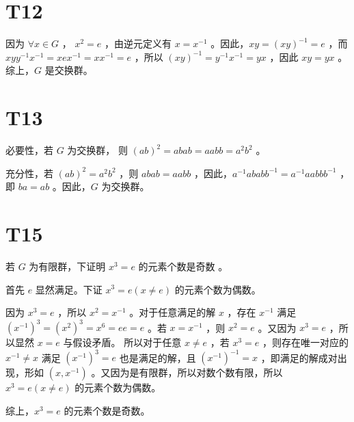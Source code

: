 \documentclass[fontset=windows]{article}
\begin{document}
\section*{T12}

因为 $\forall x \in G$ ， $x ^ 2 = e$ ，由逆元定义有 $x = x ^ {-1}$ 。因此，$x y = (xy) ^ {-1} = e$ ，而 $x y y ^ {-1} x ^ {-1} = x e x ^ {-1} = x x ^ {-1} = e$ ，所以 $(xy) ^ {-1} = y ^ {-1} x ^ {-1} = y x$ ，因此 $xy = yx$ 。综上，$G$ 是交换群。

\section*{T13}

必要性，若 $G$ 为交换群， 则 $(ab)^2 = abab = aabb = a^2 b^2$ 。

充分性，若 $(ab)^2 = a^2 b^2$ ，则 $abab = aabb$ ，因此，$a ^{-1} abab b ^{-1} = a ^{-1} aabb b ^{-1}$ ，即 $ba = ab$ 。因此，$G$ 为交换群。 

\section*{T15}

若 $G$ 为有限群，下证明 $x ^ 3 = e $ 的元素个数是奇数 。

首先 $e$ 显然满足。下证 $x ^ 3 = e (x\ne e)$ 的元素个数为偶数。

因为 $x ^ 3 = e$ ，所以 $x ^ 2 = x ^ {-1}$ 。对于任意满足的解 $x$ ，存在 $x ^ {-1}$ 满足 $(x ^ {-1}) ^ 3 = (x ^ 2) ^ 3 = x ^ 6 = ee = e$ 。若 $x = x^{-1}$ ，则 $x ^ 2 = e$ 。又因为 $x ^ 3 = e$ ，所以显然 $x = e$ 与假设矛盾。 所以对于任意 $x \ne e$ ，若 $x ^ 3 = e$ ，则存在唯一对应的 $x ^ {-1} \ne x$ 满足 $(x ^ {-1}) ^ 3 = e$ 也是满足的解，且 $(x ^ {-1}) ^ {-1} = x$ ，即满足的解成对出现，形如 $(x,x^{-1})$ 。又因为是有限群，所以对数个数有限，所以 $x ^ 3 = e (x \ne e)$ 的元素个数为偶数。

综上，$x ^ 3 = e$ 的元素个数是奇数。
\end{document}
